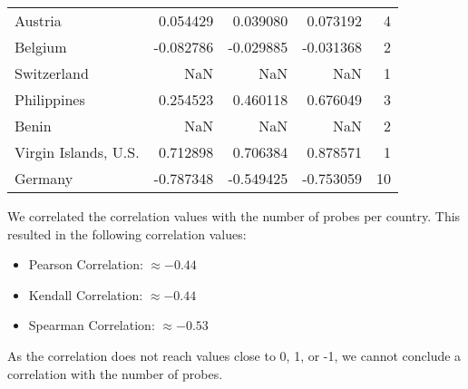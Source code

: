 \begin{table}[ht]
\begin{tabular}{lrrrr}
		Austria               & 0.054429    & 0.039080    & 0.073192    & 4         \\
		Belgium               & -0.082786   & -0.029885   & -0.031368   & 2         \\
		Switzerland           & NaN         & NaN         & NaN         & 1         \\
		Philippines           & 0.254523    & 0.460118    & 0.676049    & 3         \\
		Benin                 & NaN         & NaN         & NaN         & 2         \\
		Virgin Islands, U.S.  & 0.712898    & 0.706384    & 0.878571    & 1         \\
		Germany               & -0.787348   & -0.549425   & -0.753059   & 10        \\
		\bottomrule
	\end{tabular}
\end{table}

We correlated the correlation values with the number of probes per country. This resulted in the following correlation values:

\begin{itemize}
	\item Pearson Correlation: $\approx -0.44$
	\item Kendall Correlation: $\approx -0.44$
	\item Spearman Correlation: $\approx -0.53$
\end{itemize}

As the correlation does not reach values close to 0, 1, or -1, we cannot conclude a correlation with the number of probes.

